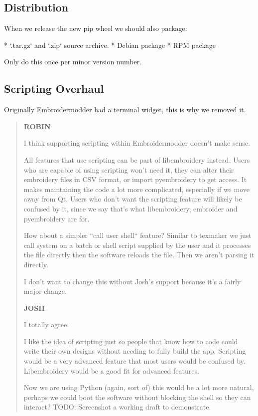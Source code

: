 \documentclass{report}
\begin{document}
\subsection{Distribution}

When we release the new pip wheel we should also package:

* `.tar.gz` and `.zip` source archive.
* Debian package
* RPM package

Only do this once per minor version number.

\subsection{Scripting Overhaul}

Originally Embroidermodder had a terminal widget, this is why we removed it.

\begin{quote}
\textbf{ROBIN}

I think supporting scripting within Embroidermodder doesn't make sense.

All features that use scripting can be part of libembroidery instead.
Users who are capable of using scripting won't need it, they can alter their embroidery files in CSV format, or import pyembroidery to get access.
It makes maintaining the code a lot more complicated, especially if we move away from Qt.
Users who don't want the scripting feature will likely be confused by it, since we say that's what libembroidery, embroider and pyembroidery are for.

How about a simpler ``call user shell`` feature? Similar to texmaker we just call system on a batch or shell script supplied by the user and it processes the file directly then the software reloads the file. Then we aren't parsing it directly.

I don't want to change this without Josh's support because it's a fairly major change.

\textbf{JOSH}

I totally agree.

I like the idea of scripting just so people that know how to code could write their own designs without needing to fully build the app. Scripting would be a very advanced feature that most users would be confused by. Libembroidery would be a good fit for advanced features.

Now we are using Python (again, sort of) this would be a lot more natural,
perhaps we could boot the software without blocking the shell so they can
interact? TODO: Screenshot a working draft to demonstrate.
\end{quote}
\end{document}
